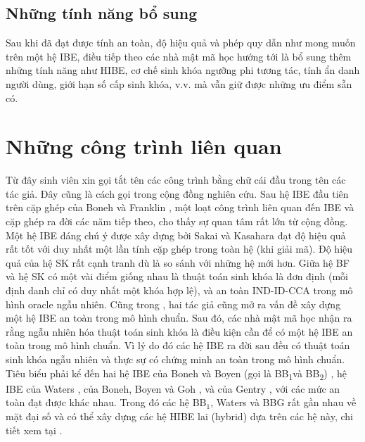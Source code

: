 \documentclass[class=report, crop=false]{standalone}
\begin{document}
		\subsection{Những tính năng bổ sung}
			Sau khi đã đạt được tính an toàn, độ hiệu quả và phép quy dẫn như mong muốn trên một hệ IBE, điều tiếp theo các nhà mật mã học hướng tới là bổ sung thêm những tính năng như HIBE, cơ chế sinh khóa ngưỡng phi tương tác, tính ẩn danh người dùng, giới hạn số cấp sinh khóa, v.v. mà vẫn giữ được những ưu điểm sẵn có.
		
	\section{Những công trình liên quan}\label{chap:2.related_works}
		Từ đây sinh viên xin gọi tắt tên các công trình bằng chữ cái đầu trong tên các tác giả. Đây cũng là cách gọi trong cộng đồng nghiên cứu. Sau hệ IBE đầu tiên trên cặp ghép của Boneh và Franklin \cite{DBLP:conf/crypto/BonehF01}, một loạt công trình liên quan đến IBE và cặp ghép ra đời các năm tiếp theo, cho thấy sự quan tâm rất lớn từ cộng đồng. Một hệ IBE đáng chú ý được xây dựng bởi Sakai và Kasahara \cite{DBLP:journals/iacr/SakaiK03} đạt độ hiệu quả rất tốt với duy nhất một lần tính cặp ghép trong toàn hệ (khi giải mã). Độ hiệu quả của hệ SK rất cạnh tranh dù là so sánh với những hệ mới hơn. Giữa hệ BF và hệ SK có một vài điểm giống nhau là thuật toán sinh khóa là đơn định (mỗi định danh chỉ có duy nhất một khóa hợp lệ), và an toàn IND-ID-CCA trong mô hình oracle ngẫu nhiên. Cũng trong \cite{DBLP:conf/crypto/BonehF01}, hai tác giả cũng mở ra vấn đề xây dựng một hệ IBE an toàn trong mô hình chuẩn. Sau đó, các nhà mật mã học nhận ra rằng ngẫu nhiên hóa thuật toán sinh khóa là điều kiện cần để có một hệ IBE an toàn trong mô hình chuẩn. Vì lý do đó các hệ IBE ra đời sau đều có thuật toán sinh khóa ngẫu nhiên và thực sự có chứng minh an toàn trong mô hình chuẩn. Tiêu biểu phải kể đến hai hệ IBE của Boneh và Boyen (gọi là BB\textsubscript{1}và BB\textsubscript{2}) \cite{DBLP:journals/joc/BonehB11}, hệ IBE của Waters \cite{DBLP:conf/eurocrypt/Waters05}, của Boneh, Boyen và Goh \cite{DBLP:conf/eurocrypt/BonehBG05}, và của Gentry \cite{DBLP:conf/eurocrypt/Gentry06}, với các mức an toàn đạt được khác nhau. Trong đó các hệ BB$_1$, Waters và BBG rất gần nhau về mặt đại số và có thể xây dựng các hệ HIBE lai (hybrid) dựa trên các hệ này, chi tiết xem tại \cite[mục 4.2]{DBLP:conf/eurocrypt/BonehBG05}.
\end{document}
